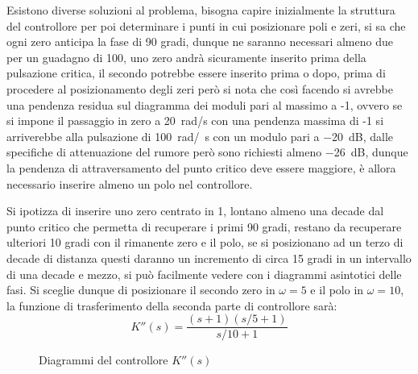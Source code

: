 Esistono diverse soluzioni al problema, bisogna capire inizialmente la struttura del controllore per poi determinare i punti in cui posizionare poli e zeri, si sa che ogni zero anticipa la fase di 90 gradi, dunque ne saranno necessari almeno due per un guadagno di 100, uno zero andrà sicuramente inserito prima della pulsazione critica, il secondo potrebbe essere inserito prima o dopo, prima di procedere al posizionamento degli zeri però si nota che così facendo si avrebbe una pendenza residua sul diagramma dei moduli pari al massimo a -1, ovvero se si impone il passaggio in zero a \SI{20}{\radian/\second} con una pendenza massima di -1 si arriverebbe alla pulsazione di \SI{100}{\radian/\per\second} con un modulo pari a \SI{-20}{\deci\bel}, dalle specifiche di attenuazione del rumore però sono richiesti almeno \SI{-26}{\deci\bel}, dunque la pendenza di attraversamento del punto critico deve essere maggiore, è allora necessario inserire almeno un polo nel controllore.

Si ipotizza di inserire uno zero centrato in 1, lontano almeno una decade dal punto critico che permetta di recuperare i primi 90 gradi, restano da recuperare
ulteriori 10 gradi con il rimanente zero e il polo, se si posizionano ad un terzo di decade di distanza questi daranno un incremento di circa 15 gradi in un intervallo di una decade e mezzo, si può facilmente vedere con i diagrammi asintotici delle fasi.
Si sceglie dunque di posizionare il secondo zero in $\omega=5$ e il polo in $\omega = 10$, la funzione di trasferimento della seconda parte di controllore sarà:
$$
    K''(s) = \frac{(s+1)(s/5+1)}{s/10+1}
$$
\newpage
\begin{figure}[h]
    \centering
    \caption{Diagrammi del controllore $K''(s)$}
    \label{fig:bode_K2_es_2}
\end{figure}

